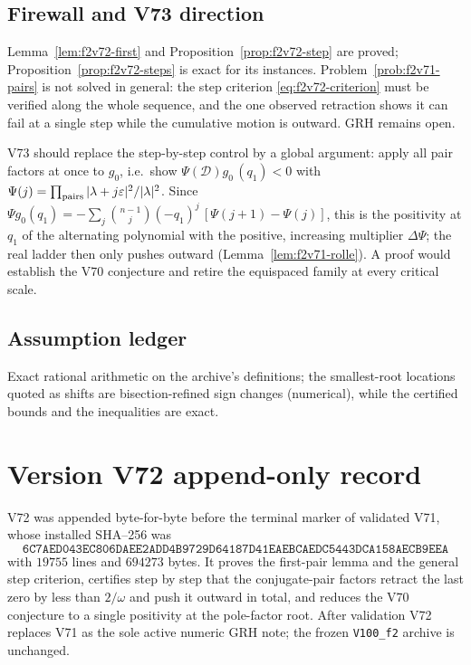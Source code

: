 \documentclass[11pt]{article}
\theoremstyle{definition}
\theoremstyle{remark}
\begin{document}
\subsection*{Firewall and V73 direction}
\label{fire:f2v72}
Lemma~\ref{lem:f2v72-first} and Proposition~\ref{prop:f2v72-step} are
proved; Proposition~\ref{prop:f2v72-steps} is exact for its instances.
Problem~\ref{prob:f2v71-pairs} is not solved in general: the step
criterion \eqref{eq:f2v72-criterion} must be verified along the whole
sequence, and the one observed retraction shows it can fail at a single
step while the cumulative motion is outward.  GRH remains open.

V73 should replace the step-by-step control by a global argument: apply
all pair factors at once to \(g_0\), i.e.\ show
\(\Psi(\mathcal D)g_0\,(q_1)<0\) with \(\Psi(j)=\prod_{\rm pairs}|\lambda+j\varepsilon|^2/|\lambda|^2\).
Since \(\Psi g_0(q_1)=-\sum_j\binom{n-1}j(-q_1)^j\,[\Psi(j+1)-\Psi(j)]\),
this is the positivity at \(q_1\) of the alternating polynomial with the
positive, increasing multiplier \(\Delta\Psi\); the real ladder then only
pushes outward (Lemma~\ref{lem:f2v71-rolle}).  A proof would establish
the V70 conjecture and retire the equispaced family at every critical
scale.

\subsection*{Assumption ledger}
\label{ass:f2v72}
Exact rational arithmetic on the archive's definitions; the smallest-root
locations quoted as shifts are bisection-refined sign changes (numerical),
while the certified bounds and the inequalities are exact.
\endgroup

\section*{Version V72 append-only record}

V72 was appended byte-for-byte before the terminal marker of validated
V71, whose installed SHA--256 was
\[
 \texttt{6C7AED043EC806DAEE2ADD4B9729D641}
 \allowbreak\texttt{87D41EAEBCAEDC5443DCA158AECB9EEA}
\]
with \(19755\) lines and \(694273\) bytes.  It proves the first-pair
lemma and the general step criterion, certifies step by step that the
conjugate-pair factors retract the last zero by less than \(2/\omega\)
and push it outward in total, and reduces the V70 conjecture to a single
positivity at the pole-factor root.  After validation V72 replaces V71 as
the sole active numeric GRH note; the frozen \texttt{V100\_f2} archive is
unchanged.
\end{document}
